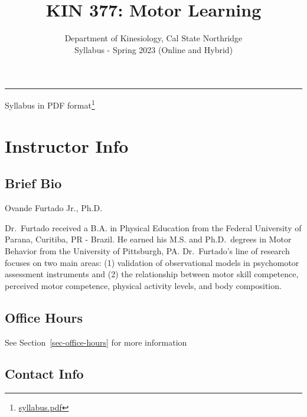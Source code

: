 \documentclass[
  letterpaper,
  DIV=11,
  numbers=noendperiod]{scrartcl}
\title{KIN 377: Motor Learning}
\subtitle{Department of Kinesiology, Cal State Northridge\\
Syllabus - Spring 2023 (Online and Hybrid)}
\author{}
\date{}
\renewcommand*\contentsname{Table of contents}
\newcommand\contentsname{Table of contents}
\DeclareRobustCommand{\href}[2]{#2\footnote{\url{#1}}}
\begin{document}
\maketitle
\ifdefined\Shaded\renewenvironment{Shaded}{\begin{tcolorbox}[borderline west={3pt}{0pt}{shadecolor}, frame hidden, boxrule=0pt, enhanced, breakable, sharp corners, interior hidden]}{\end{tcolorbox}}\fi

\renewcommand*\contentsname{Table of contents}
{
\hypersetup{linkcolor=}
\setcounter{tocdepth}{3}
\tableofcontents
}
\begin{center}\rule{0.5\linewidth}{0.5pt}\end{center}

\href{syllabus.pdf}{Syllabus in PDF format}

\hypertarget{sec-instructor-info}{%
\section{Instructor Info}\label{sec-instructor-info}}

\hypertarget{brief-bio}{%
\subsection{Brief Bio}\label{brief-bio}}

Ovande Furtado Jr., Ph.D.

Dr.~Furtado received a B.A. in Physical Education from the Federal
University of Parana, Curitiba, PR - Brazil. He earned his M.S. and
Ph.D.~degrees in Motor Behavior from the University of Pittsburgh, PA.
Dr.~Furtado's line of research focuses on two main areas: (1) validation
of observational models in psychomotor assessment instruments and (2)
the relationship between motor skill competence, perceived motor
competence, physical activity levels, and body composition.

\hypertarget{office-hours}{%
\subsection{Office Hours}\label{office-hours}}

See Section~\ref{sec-office-hours} for more information

\hypertarget{contact-info}{%
\subsection{Contact Info}\label{contact-info}}
\end{document}
